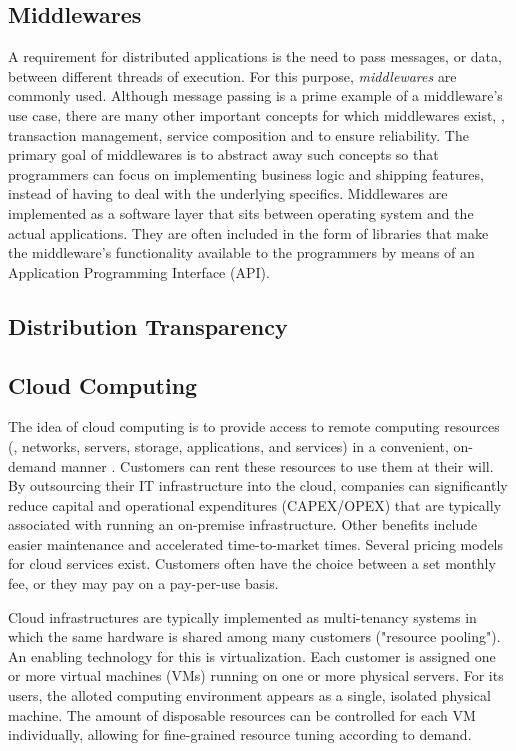 \subsection{Middlewares}
A requirement for distributed applications is the need to pass messages, or data, between different threads of execution. For this purpose, \emph{middlewares} \cite{bernstein1996middleware} are commonly used. Although message passing is a prime example of a middleware's use case, there are many other important concepts for which middlewares exist, \eg , transaction management, service composition and to ensure reliability. The primary goal of middlewares is to abstract away such concepts so that programmers can focus on implementing business logic and shipping features, instead of having to deal with the underlying specifics. Middlewares are implemented as a software layer that sits between operating system and the actual applications. They are often included in the form of libraries that make the middleware's functionality available to the programmers by means of an Application Programming Interface (API).


\subsection{Distribution Transparency}



\subsection{Cloud Computing}

The idea of cloud computing is to provide access to remote computing resources  (\eg , networks, servers, storage, applications, and services) in a convenient, on-demand manner \cite{mell2011nist}. Customers can rent these resources to use them at their will. By outsourcing their IT infrastructure into the cloud, companies can significantly reduce capital and operational expenditures (CAPEX/OPEX) that are typically associated with running an on-premise infrastructure. Other benefits include easier maintenance and accelerated time-to-market times. Several pricing models for cloud services exist. Customers often have the choice between a set monthly fee, or they may pay on a pay-per-use basis.

Cloud infrastructures are typically implemented as multi-tenancy systems in which the same hardware is shared among many customers ("resource pooling"). An enabling technology for this is virtualization. Each customer is assigned one or more virtual machines (VMs) running on one or more physical servers. For its users, the alloted computing environment appears as a single, isolated physical machine. The amount of disposable resources can be controlled for each VM individually, allowing for fine-grained resource tuning according to demand.

